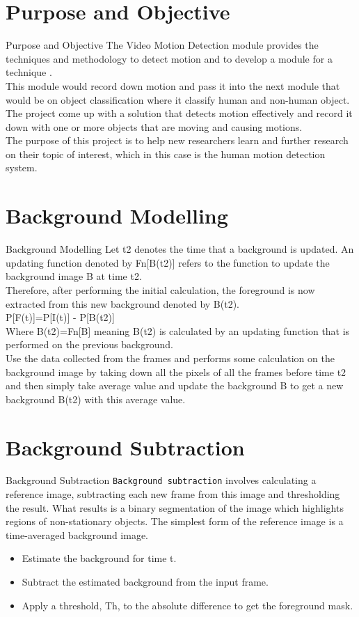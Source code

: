 \documentclass{beamer}
\begin{document}
\section{Purpose and Objective}
\begin{frame}{Purpose and Objective}
The Video Motion Detection module provides the techniques and methodology to detect motion and to develop a module for a technique .\\
This module would record down motion and pass it into the next module that would be on object classification where it classify human and non-human object.\\
The project come up with a solution that detects motion effectively and record it down with one or more objects that are moving and causing motions.\\
The purpose of this project is to help new researchers learn and further research on their topic of interest, which in this case
is the human motion detection system. 
\end{frame}
\section{Background Modelling}
\begin{frame}{Background Modelling}
Let t2 denotes the time that a background is updated. An updating function denoted by
Fn[B(t2)] refers to the function to update the background image B at time t2.\\
Therefore, after performing the initial calculation, the foreground is now extracted from this new background denoted by B(t2).\\
P[F(t)]=P[I(t)] - P[B(t2)]\\
Where B(t2)=Fn[B] meaning B(t2) is calculated by an updating function that is performed on the previous background. \\
Use the data collected from the frames and performs some calculation on the background image by taking down all the pixels of all the frames before time t2 and then simply take average value and update the background B to get a new background B(t2) with this average value. 
\end{frame}
\section{Background Subtraction}
\begin{frame}{Background Subtraction}
\texttt{Background subtraction} involves calculating a reference image, subtracting each new frame from this image and thresholding the result. What results is a binary segmentation of the image which highlights regions of non-stationary objects. The simplest form of the reference image is a time-averaged background image.\\
\begin{itemize}
\item Estimate the background for time t.
\item Subtract the estimated background from the input frame.
\item Apply a threshold, Th, to the absolute difference to get the foreground mask.
\end{itemize}
\end{frame}
\end{document}
